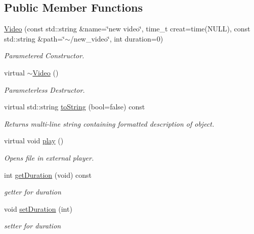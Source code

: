 \subsection*{Public Member Functions}
\begin{DoxyCompactItemize}
\item 
\hypertarget{classVideo_aa360b390158aec7378c1dceb8602138b}{\hyperlink{classVideo_aa360b390158aec7378c1dceb8602138b}{Video} (const std\+::string \&name=\char`\"{}new video\char`\"{}, time\+\_\+t creat=time(N\+U\+L\+L), const std\+::string \&path=\char`\"{}$\sim$/new\+\_\+video\char`\"{}, int duration=0)}\label{classVideo_aa360b390158aec7378c1dceb8602138b}

\begin{DoxyCompactList}\small\item\em Parametered Constructor. \end{DoxyCompactList}\item 
virtual \hyperlink{classVideo_aebf7e2a8fa2bbd79335b1cf35925d190}{$\sim$\+Video} ()
\begin{DoxyCompactList}\small\item\em Parameterless Destructor. \end{DoxyCompactList}\item 
\hypertarget{classVideo_abd241d68fe0a4e5a83d6ca5b0b070bf4}{virtual std\+::string \hyperlink{classVideo_abd241d68fe0a4e5a83d6ca5b0b070bf4}{to\+String} (bool=false) const }\label{classVideo_abd241d68fe0a4e5a83d6ca5b0b070bf4}

\begin{DoxyCompactList}\small\item\em Returns multi-\/line string containing formatted description of object. \end{DoxyCompactList}\item 
\hypertarget{classVideo_a192acb2bbb1592566ec2393dc99e3083}{virtual void \hyperlink{classVideo_a192acb2bbb1592566ec2393dc99e3083}{play} ()}\label{classVideo_a192acb2bbb1592566ec2393dc99e3083}

\begin{DoxyCompactList}\small\item\em Opens file in external player. \end{DoxyCompactList}\item 
\hypertarget{classVideo_a1a495dbb8b0389e092758c62144ebc45}{int \hyperlink{classVideo_a1a495dbb8b0389e092758c62144ebc45}{get\+Duration} (void) const }\label{classVideo_a1a495dbb8b0389e092758c62144ebc45}

\begin{DoxyCompactList}\small\item\em getter for duration \end{DoxyCompactList}\item 
\hypertarget{classVideo_a0fbbf03b902423efa2179142902bb0d0}{void \hyperlink{classVideo_a0fbbf03b902423efa2179142902bb0d0}{set\+Duration} (int)}\label{classVideo_a0fbbf03b902423efa2179142902bb0d0}

\begin{DoxyCompactList}\small\item\em setter for duration \end{DoxyCompactList}\end{DoxyCompactItemize}


